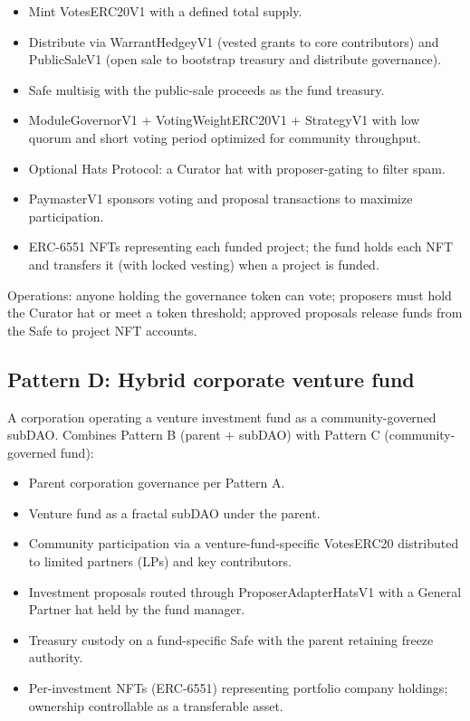 \documentclass[11pt,letterpaper]{article}
\begin{document}
\begin{itemize}
\item Mint VotesERC20V1 with a defined total supply.
\item Distribute via WarrantHedgeyV1 (vested grants to core contributors) and PublicSaleV1 (open sale to bootstrap treasury and distribute governance).
\item Safe multisig with the public-sale proceeds as the fund treasury.
\item ModuleGovernorV1 + VotingWeightERC20V1 + StrategyV1 with low quorum and short voting period optimized for community throughput.
\item Optional Hats Protocol: a Curator hat with proposer-gating to filter spam.
\item PaymasterV1 sponsors voting and proposal transactions to maximize participation.
\item ERC-6551 NFTs representing each funded project; the fund holds each NFT and transfers it (with locked vesting) when a project is funded.
\end{itemize}

Operations: anyone holding the governance token can vote; proposers must hold the Curator hat or meet a token threshold; approved proposals release funds from the Safe to project NFT accounts.

\subsection{Pattern D: Hybrid corporate venture fund}

A corporation operating a venture investment fund as a community-governed subDAO. Combines Pattern B (parent + subDAO) with Pattern C (community-governed fund):

\begin{itemize}
\item Parent corporation governance per Pattern A.
\item Venture fund as a fractal subDAO under the parent.
\item Community participation via a venture-fund-specific VotesERC20 distributed to limited partners (LPs) and key contributors.
\item Investment proposals routed through ProposerAdapterHatsV1 with a General Partner hat held by the fund manager.
\item Treasury custody on a fund-specific Safe with the parent retaining freeze authority.
\item Per-investment NFTs (ERC-6551) representing portfolio company holdings; ownership controllable as a transferable asset.
\end{itemize}
\end{document}
